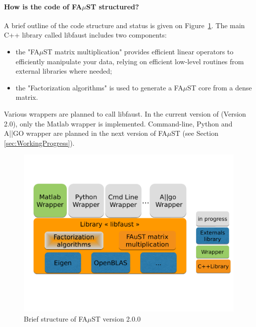 \paragraph{How is the code of FA$\mu$ST structured?}
A brief outline of the code structure and status is given on Figure~\ref{fig:faustStructure}. The main C++ library called \textrm{libfaust} includes two components:
\begin{itemize}
\item the "FA$\mu$ST matrix multiplication" provides efficient linear operators to efficiently manipulate your data, relying on efficient low-level routines from external libraries where needed; 
\item the "Factorization algorithms" is used to generate a FA$\mu$ST core from a dense matrix. 
\end{itemize}
Various wrappers are planned to call \textrm{libfaust}. In the current version of \FAuST (Version 2.0), only the Matlab wrapper is implemented. Command-line, Python and A||GO wrapper are planned in the next version of FA$\mu$ST (see Section \ref{sec:WorkingProgress}).   


\begin{figure}[H] %
\centering
\includegraphics[scale=0.45,trim = 0cm 5cm 0cm 4cm, clip]{images/FaustStructure.pdf}
\caption{Brief structure of FA$\mu$ST version 2.0.0}
\label{fig:faustStructure}
\end{figure}

